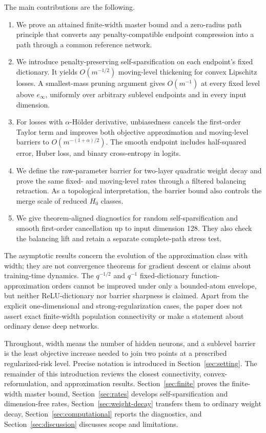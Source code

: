 \documentclass[smallextended,envcountsect]{svjour3}
\begin{document}
The main contributions are the following.
\begin{enumerate}
\item We prove an attained finite-width master bound and a zero-radius path principle that converts any penalty-compatible endpoint compression into a path through a common reference network.
\item We introduce penalty-preserving self-sparsification on each endpoint's
fixed dictionary. It yields $O(m^{-1/2})$ moving-level thickening for convex
Lipschitz losses. A smallest-mass pruning argument gives $O(m^{-1})$ at every
fixed level above $e_\infty$, uniformly over arbitrary sublevel endpoints and
in every input dimension.
\item For losses with $\alpha$-H\"older derivative, unbiasedness cancels the first-order Taylor term and improves both objective approximation and moving-level barriers to $O(m^{-(1+\alpha)/2})$. The smooth endpoint includes half-squared error, Huber loss, and binary cross-entropy in logits.
\item We define the raw-parameter barrier for two-layer quadratic weight decay
and prove the same fixed- and moving-level rates through a filtered balancing
retraction. As a topological interpretation, the barrier bound also controls
the merge scale of reduced $H_0$ classes.
\item We give theorem-aligned diagnostics for random self-sparsification and
smooth first-order cancellation up to input dimension 128. They also check the
balancing lift and retain a separate complete-path stress test.
\end{enumerate}

The asymptotic results concern the evolution of the approximation class with width; they are not convergence theorems for gradient descent or claims about training-time dynamics. The $q^{-1/2}$ and $q^{-1}$ fixed-dictionary function-approximation orders cannot be improved under only a bounded-atom envelope, but neither ReLU-dictionary nor barrier sharpness is claimed. Apart from the explicit one-dimensional and strong-regularization cases, the paper does not assert exact finite-width population connectivity or make a statement about ordinary dense deep networks.

Throughout, width means the number of hidden neurons, and a sublevel barrier is
the least objective increase needed to join two points at a prescribed
regularized-risk level. Precise notation is introduced in
Section~\ref{sec:setting}. The remainder of this introduction reviews the
closest connectivity, convex-reformulation, and approximation results.
Section~\ref{sec:finite} proves the finite-width master bound,
Section~\ref{sec:rates} develops self-sparsification and dimension-free rates,
Section~\ref{sec:weight-decay} transfers them to ordinary weight decay,
Section~\ref{sec:computational} reports the diagnostics, and
Section~\ref{sec:discussion} discusses scope and limitations.
\end{document}
